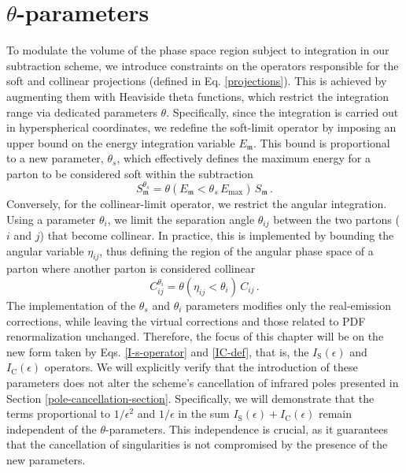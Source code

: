 \documentclass[a4paper, 12pt]{book}
\newcommand{\um}{\mathfrak{m}}
\begin{document}
\section{$\theta$-parameters}
To modulate the volume of the phase space region subject to integration in our subtraction scheme, we introduce constraints on the operators responsible for the soft and collinear projections (defined in Eq. \ref{projections}). This is achieved by augmenting them with Heaviside theta functions, which restrict the integration range via dedicated parameters $\theta$. Specifically, since the integration is carried out in hyperspherical coordinates, we redefine the soft-limit operator by imposing an upper bound on the energy integration variable $E_\um$. This bound is proportional to a new parameter, $\theta_s$, which effectively defines the maximum energy for a parton to be considered soft within the subtraction
\begin{equation}
S_\um^{\theta_s} = \theta{(E_\um < \theta_s \, E_{\mathrm{max}})} \, S_\um \,.
\end{equation}
Conversely, for the collinear-limit operator, we restrict the angular integration. Using a parameter $\theta_i$, we limit the separation angle $\theta_{ij}$ between the two partons ($i$ and $j$) that become collinear. In practice, this is implemented by bounding the angular variable $\eta_{ij}$, thus defining the region of the angular phase space of a parton where another parton is considered collinear
\begin{equation}
C_{ij}^{\theta_i} = \theta{(\eta_{ij} < \theta_i )} \, C_{ij}\, .
\end{equation}
The implementation of the $\theta_s$ and $\theta_i$ parameters modifies only the real-emission corrections, while leaving the virtual corrections and those related to PDF renormalization unchanged. Therefore, the focus of this chapter will be on the new form taken by Eqs. \ref{I-s-operator} and \ref{IC-def}, that is, the $I_{\mathrm{S}}(\epsilon)$ and $I_{\mathrm{C}}(\epsilon)$ operators. We will explicitly verify that the introduction of these parameters does not alter the scheme's cancellation of infrared poles presented in Section \ref{pole-cancellation-section}. Specifically, we will demonstrate that the terms proportional to $1/\epsilon^2$ and $1/\epsilon$ in the sum $I_{\mathrm{S}}(\epsilon) + I_{\mathrm{C}}(\epsilon)$ remain independent of the $\theta$-parameters. This independence is crucial, as it guarantees that the cancellation of singularities is not compromised by the presence of the new parameters.
\end{document}

